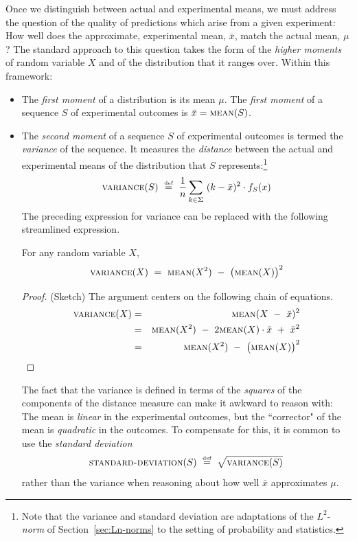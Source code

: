 Once we distinguish between actual and experimental means, we must address the question of the quality of predictions which arise from a given experiment:  How well does the approximate, experimental mean, $\bar{x}$, match the actual mean, $\mu$?  The standard approach to this question takes the form of the {\em higher moments} of random variable $X$ and of the distribution that it ranges over.  Within this framework:
\begin{itemize}
\item
The {\em first moment} of a distribution is its mean $\mu$.  The  {\em first moment} of a sequence $S$ of experimental outcomes is $\bar{x}  =  \mbox{\sc mean}(S)$.
\medskip\item
The {\em second moment} of a sequence $S$ of experimental outcomes is termed the {\it variance} of the sequence.   It measures the {\em distance} between the actual and experimental means of the distribution that $S$ represents:\footnote{Note that the variance and standard deviation are adaptations of the $L^2$-{\it norm} of Section~\ref{sec:Ln-norms} to the setting of probability and statistics.}
\[  \mbox{\sc variance}(S) \ \stackrel{\mbox{{\tiny def}}}{=} \ {1 \over n} \sum_{k \in \Sigma}
\ (k - \bar{x})^2 \cdot f_S(x) 
\]
The preceding expression for variance can be replaced with the following streamlined expression.

\begin{prop}
\label{thm:variance-formula}
For any random variable $X$,
\[ \mbox{\sc variance}(X) \ = \ \mbox{\sc mean}(X^2) \ - \ \big(\mbox{\sc mean}(X)\big)^2 \]
\end{prop}

\begin{proof}{(Sketch)}
The argument centers on the following chain of equations.
\begin{eqnarray*}
\mbox{\sc variance}(X) & = &
  \mbox{\sc mean}(X \ - \ \bar{x})^2 \\
 & = &
\mbox{\sc mean}(X^2) \ - \ 2 \mbox{\sc mean}(X) \cdot \bar{x} \ + \ \bar{x}^2 \\
 & = &
\mbox{\sc mean}(X^2) \ - \ \big(\mbox{\sc mean}(X)\big)^2
\end{eqnarray*}
\end{proof}

The fact that the variance is defined in terms of the {\em squares} of the components of the distance measure can make it awkward to reason with:  The mean is {\em linear} in the experimental outcomes, but the ``corrector" of the mean is {\em quadratic} in the outcomes.  To compensate for this, it is common to use the {\it standard deviation}
\[ \mbox{\sc standard-deviation}(S) \ \eqdef \ \sqrt{\mbox{\sc variance}(S)} \]
rather than the variance when reasoning about how well $\bar{x}$ approximates $\mu$.


\end{itemize}
